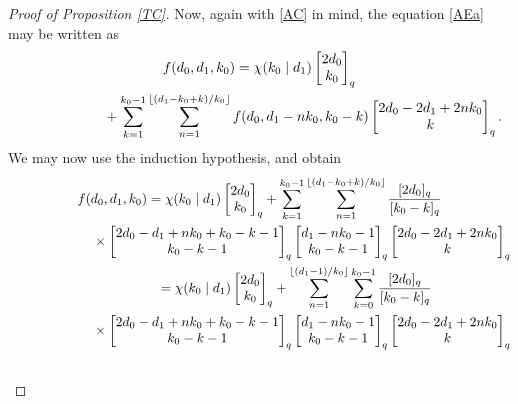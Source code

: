 \documentclass[pdftex]{sigma}
\def\fl#1{\lfloor#1\rfloor}
\begin{document}
\begin{proof}[Proof of Proposition \ref{TC}]
Now, again with \eqref{AC} in mind, the equation \eqref{AEa} may be written as
\begin{gather*}
f(d_0,d_1,k_0)=
\chi(k_0\mid d_1)\begin{bmatrix} 2d_0\\k_0\end{bmatrix}_q\\ \hphantom{f(d_0,d_1,k_0)=}{}
+\sum_{k=1}^{k_0-1}
\sum_{n=1}^{\fl{(d_1-k_0+k)/k_0}}
f(d_0,d_1-nk_0,k_0-k)
\begin{bmatrix} 2d_0-2d_1+2nk_0\\k\end{bmatrix}_q.
\end{gather*}
We may now use the induction hypothesis, and obtain
\begin{gather}
\notag
f(d_0,d_1,k_0)=\chi(k_0\mid d_1)\begin{bmatrix} 2d_0\\k_0\end{bmatrix}_q
+\sum_{k=1}^{k_0-1}
\sum_{n=1}^{\fl{(d_1-k_0+k)/k_0}}
\frac {[2d_0]_q} {[k_0-k]_q} \\ \notag
\hphantom{f(d_0,d_1,k_0)=}{}
\times\begin{bmatrix} 2d_0-d_1+nk_0+k_0-k-1\\k_0-k-1\end{bmatrix}_q
\begin{bmatrix} d_1-nk_0-1\\
k_0-k-1\end{bmatrix}_q
\begin{bmatrix} 2d_0-2d_1+2nk_0\\k\end{bmatrix}_q\\ \notag \hphantom{f(d_0,d_1,k_0)}{}
=\chi(k_0\mid d_1)\begin{bmatrix} 2d_0\\k_0\end{bmatrix}_q
+\sum_{n=1}^{\fl{(d_1-1)/k_0}}
\sum_{k=0}^{k_0-1}
\frac {[2d_0]_q} {[k_0-k]_q} \\ \notag \hphantom{f(d_0,d_1,k_0)=}{}
\times\begin{bmatrix} 2d_0-d_1+nk_0+k_0-k-1\\k_0-k-1\end{bmatrix}_q
\begin{bmatrix} d_1-nk_0-1\\
k_0-k-1\end{bmatrix}_q
\begin{bmatrix} 2d_0-2d_1+2nk_0\\k\end{bmatrix}_q\\ \hphantom{f(d_0,d_1,k_0)=}{}

\end{gather}
\end{proof}
\end{document}
